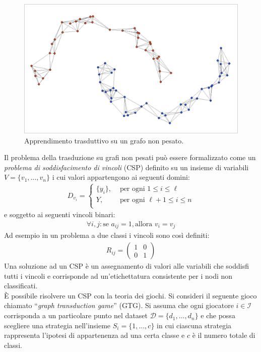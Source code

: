 	\begin{figure}[h!]
	    \centering
	    \includegraphics[width=12cm]{images/transduction}
		\caption{Apprendimento trasduttivo su un grafo non pesato.}
	\end{figure}
	
	\newpage
	
	Il problema della trasduzione su grafi non pesati può essere formalizzato come un \emph{problema di soddisfacimento di vincoli} (CSP) definito su un insieme di variabili $V = \{v_1, \dots, v_n\}$ i cui valori appartengono ai seguenti domini:
	\begin{align*}
		D_{v_i} =
		\begin{cases}
			\{y_i\}, &\text{ per ogni }1 \leq i \leq \ell\\
			Y, &\text{ per ogni }\ell + 1 \leq i \leq n\\
		\end{cases}
	\end{align*}
	e soggetto ai seguenti vincoli binari:
	\begin{align*}
		\forall i, j: \text{se } a_{ij} = 1, \text{allora } v_i = v_j
	\end{align*}
	Ad esempio in un problema a due classi i vincoli sono così definiti:
	\begin{align*}
		R_{ij} = 
		\begin{pmatrix}
			1 & 0 \\
			0 & 1
		\end{pmatrix}
	\end{align*}
	Una soluzione ad un CSP è un assegnamento di valori alle variabili che soddisfi tutti i vincoli e corrisponde ad un'etichettatura consistente per i nodi non classificati.\\
	
	È possibile risolvere un CSP con la teoria dei giochi. Si consideri il seguente gioco chiamato “\emph{graph transduction game}” (GTG). Si assuma che ogni giocatore $i \in \mathcal{I}$ corrisponda a un particolare punto nel dataset $\mathcal{D} = \{d_1, \dots, d_n \}$ e che possa scegliere una strategia nell'insieme $S_i = \{ 1, \dots, c\}$ in cui ciascuna strategia rappresenta l'ipotesi di appartenenza ad una certa classe e $c$ è il numero totale di classi.\\
	
